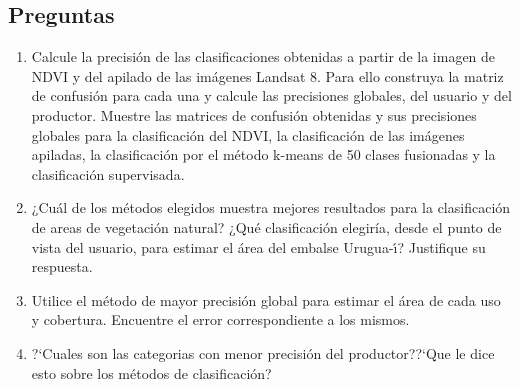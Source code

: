 \documentclass[hidelinks,12pt]{article}
\begin{document}
\subsection{Preguntas}
\begin{enumerate}
    \item Calcule la precisión de las clasificaciones obtenidas a partir de la
    imagen de NDVI y del apilado de las imágenes Landsat 8. Para ello
    construya la matriz de confusión para cada una y calcule  las precisiones
    globales, del usuario y del productor. Muestre las matrices de confusión
    obtenidas y sus precisiones globales para la clasificación del NDVI, la
    clasificación de las imágenes apiladas, la clasificación por el método
    k-means de 50 clases fusionadas y la clasificación supervisada.
    \item ¿Cuál de los métodos elegidos muestra mejores resultados para la
    clasificación de areas de vegetaci\'on natural? ¿Qué clasificaci\'on elegiría, desde
    el punto de vista del usuario, para estimar el área del embalse
    Urugua-\'{\i}? Justifique su respuesta.
    \item Utilice el método de mayor precisión global para estimar el área  de cada
    uso y cobertura. Encuentre el error correspondiente a los mismos.
    \item ?`Cuales son las categorias con menor precisi\'on del productor??`Que
        le dice esto sobre los m\'etodos de clasificaci\'on?
\end{enumerate}
\newpage
\appendix
\end{document}
